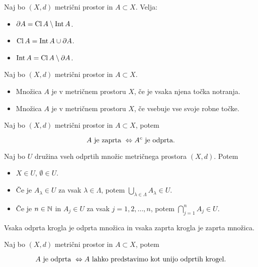 \begin{trditev}
    Naj bo $(X, d)$ metrični prostor in $A \subset X$. Velja:
    \begin{itemize}
        \item $\partial A = \operatorname{Cl} A \setminus \operatorname{Int} A$.
        \item $\operatorname{Cl} A = \operatorname{Int} A \cup \partial A$.
        \item $\operatorname{Int} A = \operatorname{Cl} A \setminus \partial A$.
    \end{itemize}
\end{trditev}

\begin{definicija}    
    Naj bo $(X, d)$ metrični prostor in $A \subset X$.
    \begin{itemize}
        \item Množica $A$ je  v metričnem prostoru $X$, če je vsaka njena točka notranja.
        \item Množica $A$ je  v metričnem prostoru $X$, če vsebuje vse svoje robne točke.
    \end{itemize}
\end{definicija}

\begin{trditev}
    Naj bo $(X, d)$ metrični prostor in $A \subset X$, potem 

    $$A \text{ je zaprta } \Leftrightarrow A^c \text{ je odprta}.$$
\end{trditev}

\begin{izrek}
    Naj bo $U$ družina vseh odprtih množic metričnega prostora $(X, d)$. Potem
    \begin{itemize}
        \item $X \in U$, $\emptyset \in U$.
        \item Če je $A_\lambda \in U$ za vsak $\lambda \in \Lambda$, potem $ \bigcup_{\lambda \in \Lambda} A_\lambda \in U$.
        \item Če je $n \in \mathbb{N}$ in $A_j \in U$ za vsak $j = 1, 2, \ldots, n$, potem $ \bigcap_{j=1}^n A_j \in U$.
    \end{itemize}
\end{izrek}

\begin{trditev}
    Vsaka odprta krogla je odprta množica in vsaka zaprta krogla je zaprta množica.
\end{trditev}

\begin{trditev}
    Naj bo $(X, d)$ metrični prostor in $A \subset X$, potem 

    $$A \text{ je odprta } \Leftrightarrow A \text{ lahko predstavimo kot unijo odprtih krogel}.$$
\end{trditev}

